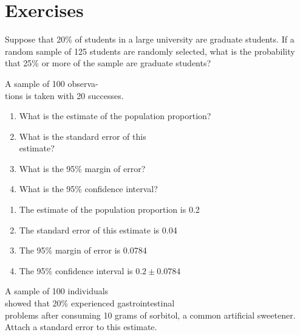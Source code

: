 \documentclass[11pt, chapterprefix=true]{scrbook}\usepackage[]{graphicx}\usepackage[]{color}
\begin{document}
\section{Exercises}
\begin{exercises}

\begin{exercise} %

Suppose that 20\% of students in a large university are graduate students.  If a random sample of 125 students are randomly selected, what is the probability that 25\% or more of the sample are graduate students?
\end{exercise}

\begin{exercise} %

A sample of 100 observa- \\ tions is taken with 20 successes.

\begin{enumerate}
\item What is the estimate of the population proportion?
\item What is the standard error of this \\ estimate?
\item What is the 95\% margin of error?
\item What is the 95\% confidence interval?
\end{enumerate}

\end{exercise}
\begin{solution} %


\begin{enumerate}
\item The estimate of the population proportion is 0.2
\item The standard error of this estimate is 0.04
\item The 95\% margin of error is 0.0784
\item The 95\% confidence interval is $0.2 $
\end{enumerate}
\end{solution}

\begin{exercise} %

A sample of 100 individuals \\ showed that 20\% experienced gastrointestinal \\ problems  after consuming 10 grams of sorbitol, a common artificial sweetener.  Attach a standard error to this estimate.
\end{exercise}
\begin{solution} %



\end{solution}
\end{exercises}
\end{document}
